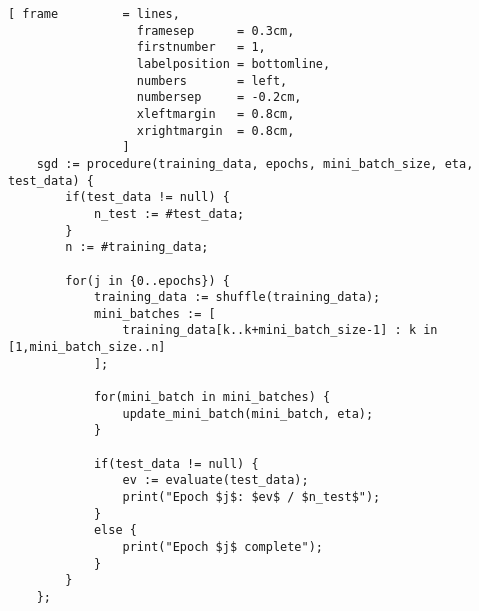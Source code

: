\begin{Verbatim}[ frame         = lines, 
                  framesep      = 0.3cm, 
                  firstnumber   = 1,
                  labelposition = bottomline,
                  numbers       = left,
                  numbersep     = -0.2cm,
                  xleftmargin   = 0.8cm,
                  xrightmargin  = 0.8cm,
                ]
    sgd := procedure(training_data, epochs, mini_batch_size, eta, test_data) {
        if(test_data != null) {
            n_test := #test_data; 		
        }
        n := #training_data;
		
        for(j in {0..epochs}) {
            training_data := shuffle(training_data);
            mini_batches := [ 
                training_data[k..k+mini_batch_size-1] : k in [1,mini_batch_size..n] 
            ];
			
            for(mini_batch in mini_batches) {
                update_mini_batch(mini_batch, eta);
            } 
			
            if(test_data != null) {
                ev := evaluate(test_data);
                print("Epoch $j$: $ev$ / $n_test$");
            }
            else {
                print("Epoch $j$ complete");
            }
        }
    };
\end{Verbatim}
